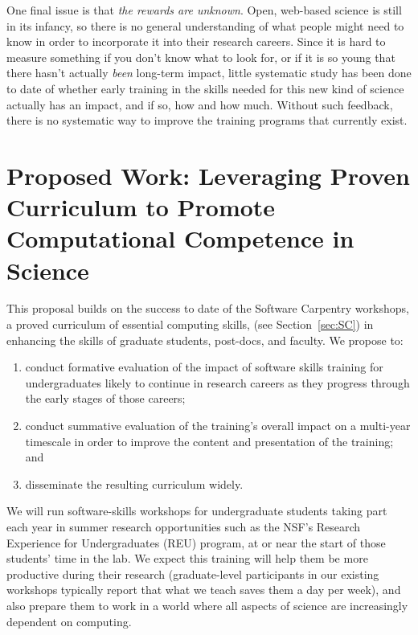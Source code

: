 \documentclass{proposalnsf}
\begin{document}
One final issue is that \emph{the rewards are unknown}.  Open,
web-based science is still in its infancy, so there is no general
understanding of what people might need to know in order to
incorporate it into their research careers.  Since it is hard to
measure something if you don't know what to look for, or if it is so
young that there hasn't actually \emph{been} long-term impact, little
systematic study has been done to date of whether early training in
the skills needed for this new kind of science actually has an impact,
and if so, how and how much.  Without such feedback, there is no
systematic way to improve the training programs that currently exist.

\section{Proposed Work: Leveraging Proven Curriculum to Promote Computational Competence in Science}

This proposal builds on the success to date of the Software Carpentry
workshops, a proved curriculum of essential computing skills, (see Section~\ref{sec:SC}) in enhancing the skills of graduate
students, post-docs, and faculty.  We propose to:

\begin{enumerate}

\item
  conduct formative evaluation of the impact of software skills
  training for undergraduates likely to continue in research careers
  as they progress through the early stages of those careers;

\item
  conduct summative evaluation of the training's overall impact on a
  multi-year timescale in order to improve the content and
  presentation of the training; and

\item
  disseminate the resulting curriculum widely.

\end{enumerate}

We will run software-skills workshops for undergraduate students
taking part each year in summer research opportunities such as the
NSF's Research Experience for Undergraduates (REU) program, at or near
the start of those students' time in the lab.  We expect this training
will help them be more productive during their research (graduate-level
participants in our existing workshops typically report that what we
teach saves them a day per week), and also prepare them to work in a
world where all aspects of science are increasingly dependent on
computing.
\end{document}
